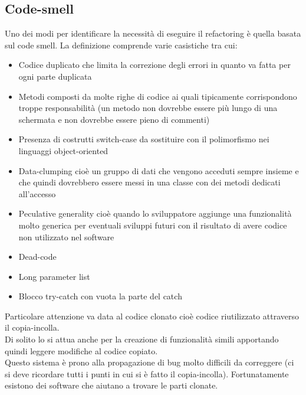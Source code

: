 \subsection{Code-smell}
Uno dei modi per identificare la necessità di eseguire il refactoring è quella basata sul code smell.
La definizione comprende varie casistiche tra cui:
\begin{itemize}[noitemsep]
    \item Codice duplicato che limita la correzione degli errori in quanto va fatta per ogni parte duplicata
    \item Metodi composti da molte righe di codice ai quali tipicamente corrispondono troppe responsabilità (un metodo non dovrebbe essere più lungo di una schermata e non dovrebbe essere pieno di commenti)
    \item Presenza di costrutti switch-case da sostituire con il polimorfismo nei linguaggi object-oriented
    \item Data-clumping cioè un gruppo di dati che vengono acceduti sempre insieme e che quindi dovrebbero essere messi in una classe con dei metodi dedicati all'accesso
    \item Peculative generality cioè quando lo sviluppatore aggiunge una funzionalità molto generica per eventuali sviluppi futuri con il risultato di avere codice non utilizzato nel software
    \item Dead-code
    \item Long parameter list
    \item Blocco try-catch con vuota la parte del catch
\end{itemize}
Particolare attenzione va data al codice clonato cioè codice riutilizzato attraverso il copia-incolla.\\
Di solito lo si attua anche per la creazione di funzionalità simili apportando quindi leggere modifiche al codice copiato.\\
Questo sistema è prono alla propagazione di bug molto difficili da correggere (ci si deve ricordare tutti i punti in cui si è fatto il copia-incolla).
Fortunatamente esistono dei software che aiutano a trovare le parti clonate.\\

